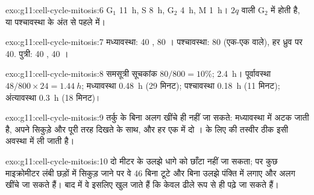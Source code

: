 \begin{solution}{exo:g11:cell-cycle-mitosis:6}
$\mathrm{G_1}$ \qty{11}{h}, S \qty{8}{h}, $\mathrm{G_2}$ \qty{4}{h},
M \qty{1}{h}। $2q$ वाली  $\mathrm{G_2}$ में होती है, या
पश्चावस्था के अंत से पहले  में।
\end{solution}

\begin{solution}{exo:g11:cell-cycle-mitosis:7}
मध्यावस्था: 40 , 80 । पश्चावस्था: 80  (एक-एक
 वाले), हर ध्रुव पर 40. पुत्री: 40 , 40 ।
\end{solution}

\begin{solution}{exo:g11:cell-cycle-mitosis:8}
समसूत्री सूचकांक $80/800 = 10\%$;  \qty{2.4}{h}।
पूर्वावस्था $48/800 \times 24 = \qty{1.44}{h}$; मध्यावस्था \qty{0.48}{h}
(29 मिनट); पश्चावस्था \qty{0.18}{h} (11 मिनट); अंत्यावस्था \qty{0.3}{h}
(18 मिनट)।
\end{solution}

\begin{solution}{exo:g11:cell-cycle-mitosis:9}
तर्कु के बिना  अलग खींचे ही नहीं जा सकते:  मध्यावस्था में
अटक जाती है, अपने सिकुड़े और पूरी तरह दिखते  के साथ, और हर एक
में दो ।  के लिए  की तस्वीर ठीक इसी
अवस्था में ली जाती है।
\end{solution}

\begin{solution}{exo:g11:cell-cycle-mitosis:10}
दो मीटर के उलझे धागे को छाँटा नहीं जा सकता; पर कुछ माइक्रोमीटर लंबी
छड़ों में सिकुड़ जाने पर वे 46  बिना टूटे और बिना उलझे पंक्ति में
लगाए और अलग खींचे जा सकते हैं। बाद में वे इसलिए खुल जाते हैं कि  केवल
ढीले रूप से ही पढ़े जा सकते हैं।
\end{solution}


